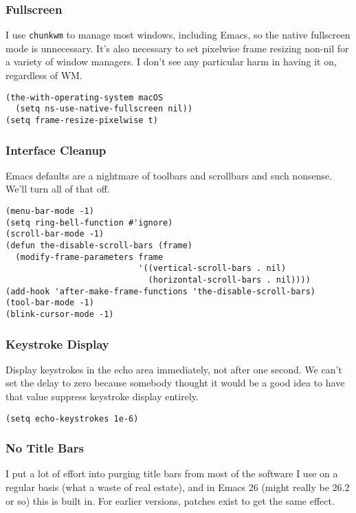 \documentclass[11pt]{article}
\begin{document}
\subsubsection{Fullscreen}
\label{sec:org75d8b00}
I use \texttt{chunkwm} to manage most windows, including Emacs, so the native
fullscreen mode is unnecessary. It's also necessary to set pixelwise
frame resizing non-nil for a variety of window managers. I don't see
any particular harm in having it on, regardless of WM.

\begin{verbatim}
(the-with-operating-system macOS
  (setq ns-use-native-fullscreen nil))
(setq frame-resize-pixelwise t)
\end{verbatim}

\subsubsection{Interface Cleanup}
\label{sec:org389b975}
Emacs defaults are a nightmare of toolbars and scrollbars and such
nonsense. We'll turn all of that off.

\begin{verbatim}
(menu-bar-mode -1)
(setq ring-bell-function #'ignore)
(scroll-bar-mode -1)
(defun the-disable-scroll-bars (frame)
  (modify-frame-parameters frame
                           '((vertical-scroll-bars . nil)
                             (horizontal-scroll-bars . nil))))
(add-hook 'after-make-frame-functions 'the-disable-scroll-bars)
(tool-bar-mode -1)
(blink-cursor-mode -1)
\end{verbatim}

\subsubsection{Keystroke Display}
\label{sec:orgca0e7a7}
Display keystrokes in the echo area immediately, not after one
second. We can't set the delay to zero because somebody thought it
would be a good idea to have that value suppress keystroke display
entirely.

\begin{verbatim}
(setq echo-keystrokes 1e-6)
\end{verbatim}

\subsubsection{No Title Bars}
\label{sec:org1846e32}
I put a lot of effort into purging title bars from most of the
software I use on a regular basis (what a waste of real estate), and
in Emacs 26 (might really be 26.2 or so) this is built in. For earlier
versions, patches exist to get the same effect.
\end{document}
